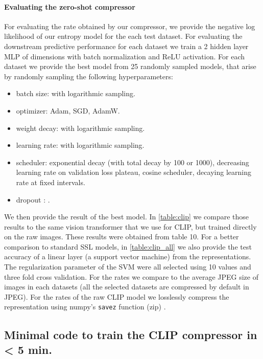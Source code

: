 \documentclass[final]{article}
\begin{document}
\paragraph{Evaluating the zero-shot compressor}
For evaluating the rate obtained by our compressor, we provide the negative log likelihood of our entropy model for the each test dataset.
For evaluating the downstream predictive performance for each dataset we train a 2 hidden layer MLP of dimensions  with batch normalization and ReLU activation.
For each dataset we provide the best model from 25 randomly sampled models, that arise by randomly sampling the following hyperparameters:
\begin{itemize}
\item batch size:  with logarithmic sampling.
\item optimizer: Adam, SGD, AdamW.
\item weight decay:  with logarithmic sampling.
\item learning rate:  with logarithmic sampling.
\item scheduler: exponential decay (with total decay by 100 or 1000), decreasing learning rate on validation loss plateau, cosine scheduler, decaying learning rate at fixed intervals.
\item dropout \cite{srivastava_dropout_2014}: .
\end{itemize}

We then provide the result of the best model. In \cref{table:clip} we compare those results to the same vision transformer that we use for CLIP, but trained directly on the raw images.
These results were obtained from  table 10.
For a better comparison to standard SSL models, in \cref{table:clip_all} we also provide the test accuracy of a linear layer (a support vector machine) from the representations. The regularization parameter of the SVM were all selected using 10 values and three fold cross validation.
For the rates we compare to the average JPEG size of images in each datasets (all the selected datasets are compressed by default in JPEG).
For the rates of the raw CLIP model we losslessly compress the representation using numpy's \texttt{savez} function (zip) \cite{harris_array_2020}.

\subsection{Minimal code to train the CLIP compressor in < 5 min.}
\label{appx:code_clip}
\end{document}

